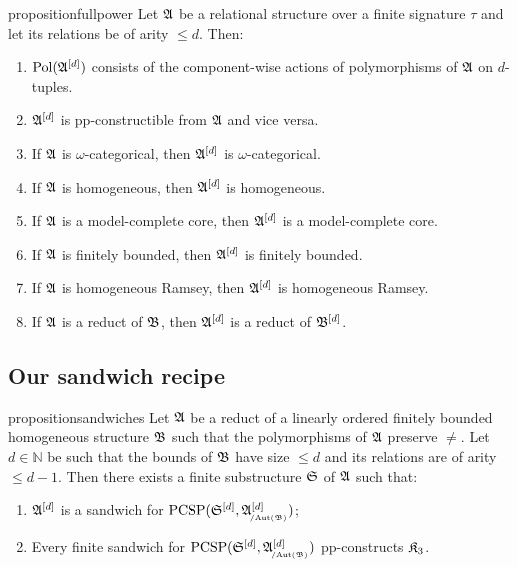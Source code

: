 \begin{restatable}{proposition}{fullpower} \label{prop:basic_properties_full_powers}
Let $\mathfrak{A}$ be a relational structure over a finite signature $\tau$ and let its relations be of arity $\leq d$. Then:
    \begin{enumerate}
        \item \label{item:fpwrpolequal} $\mathrm{Pol}({\mathfrak{A}}^{[d]})$ consists of the component-wise actions of polymorphisms of $\mathfrak{A}$ on $d$-tuples.
        \item \label{item:fpwrppconstr} ${\mathfrak{A}}^{[d]}$ is pp-constructible from $\mathfrak{A}$ and vice versa.
        \item \label{item:fpwromegacat} If $\mathfrak{A}$ is $\omega$-categorical, then ${\mathfrak{A}}^{[d]}$ is $\omega$-categorical.
        \item \label{item:fpwrhomog} If $\mathfrak{A}$ is homogeneous, then ${\mathfrak{A}}^{[d]}$ is homogeneous.
        \item \label{item:fpwrmodcompl} If $\mathfrak{A}$ is a model-complete core, then ${\mathfrak{A}}^{[d]}$ is a model-complete core.
        \item \label{item:fpwrfinbou} If $\mathfrak{A}$ is finitely bounded, then ${\mathfrak{A}}^{[d]}$ is finitely bounded.
        \item \label{item:fpwrramsey} If $\mathfrak{A}$ is homogeneous Ramsey, then ${\mathfrak{A}}^{[d]}$ is homogeneous Ramsey.
        \item \label{item:fpwrreduct} If $\mathfrak{A}$ is a reduct of $\mathfrak{B}$, then ${\mathfrak{A}}^{[d]}$ is a reduct of ${\mathfrak{B}}^{[d]}$.
    \end{enumerate} 

 \end{restatable}  
 

\subsection{Our sandwich recipe}

\begin{restatable}{proposition}{sandwiches} \label{prop:sandwiches}
Let $\mathfrak{A}$ be a reduct of a linearly ordered finitely bounded homogeneous structure $\mathfrak{B}$ such that the polymorphisms of $\mathfrak{A}$ preserve $\neq$. 
    Let $d\in\mathbb{N}$ be such that the bounds of $\mathfrak{B}$ have size $\leq d$ and its relations are of arity $\leq d-1$. 
    Then there exists a finite substructure $\mathfrak{S}$ of $\mathfrak{A}$ such that: 
    \begin{enumerate} 
        \item ${\mathfrak{A}}^{[d]}$ is a sandwich for $\PCSP(\fpwr{\struct{S}}{d},\fpwr{\struct{A}}{d}_{\orbeq{\Aut(\struct{B})}})$;
        \item  Every finite sandwich for $\PCSP(\fpwr{\struct{S}}{d},\fpwr{\struct{A}}{d}_{\orbeq{\Aut(\struct{B})}})$ pp-constructs $\mathfrak{K}_3$. 
    \end{enumerate} 
   
 \end{restatable}
    

